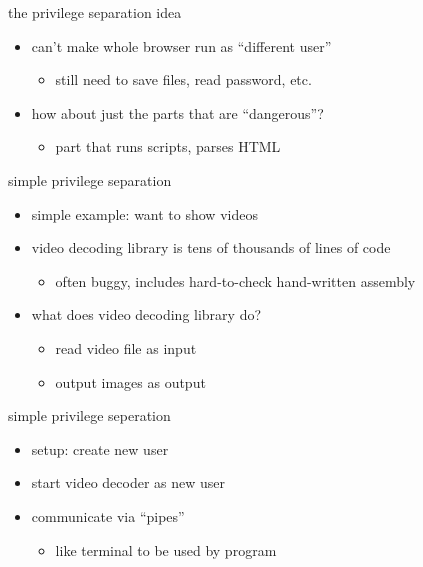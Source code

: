 \begin{frame}{the privilege separation idea}
    \begin{itemize}
    \item can't make whole browser run as ``different user''
        \begin{itemize}
        \item still need to save files, read password, etc.
        \end{itemize}
    \item how about just the parts that are ``dangerous''?
        \begin{itemize}
        \item part that runs scripts, parses HTML
        \end{itemize}
    \end{itemize}
\end{frame}

\begin{frame}{simple privilege separation}
    \begin{itemize}
    \item simple example: want to show videos
    \item video decoding library is tens of thousands of lines of code
        \begin{itemize}
        \item often buggy, includes hard-to-check hand-written assembly
        \end{itemize}
    \item what does video decoding library do?
        \begin{itemize}
        \item read video file as input
        \item output images as output
        \end{itemize}
    \end{itemize}
\end{frame}

\begin{frame}{simple privilege seperation}
    \begin{itemize}
    \item setup: create new user
    \item start video decoder as new user
    \item communicate via ``pipes''
        \begin{itemize}
        \item like terminal to be used by program
        \end{itemize}
    \end{itemize}
\end{frame}

